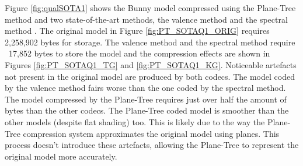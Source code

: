 Figure \ref{fig:qualSOTA1} shows the Bunny model compressed using the Plane-Tree method and two state-of-the-art methods, the valence method \cite{touma98triangle} and the spectral method \cite{Karni00Spectral}. The original model in Figure \ref{fig:PT_SOTAQ1_ORIG} requires 2,258,902 bytes for storage. The valence method and the spectral method require ~17,852 bytes to store the model and the compression effects are shown in Figures \ref{fig:PT_SOTAQ1_TG} and \ref{fig:PT_SOTAQ1_KG}. Noticeable artefacts not present in the original model are produced by both codecs. The model coded by the valence method fairs worse than the one coded by the spectral method. The model compressed by the Plane-Tree requires just over half the amount of bytes than the other codecs. The Plane-Tree coded model is smoother than the other models (despite flat shading) too. This is likely due to the way the Plane-Tree compression system approximates the original model using planes. This process doesn't introduce these artefacts, allowing the Plane-Tree to represent the original model more accurately. \\   

